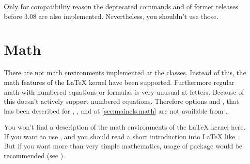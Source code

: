 Only for compatibility reason the deprecated commands  and
 of former 
releases before 3.08 are also implemented. Nevertheless, you shouldn't use
those.%
%
%
%
%
%
%
%
%
%






\section{Math}
\label{sec:scrlttr2.math}%
%
%
%

There are not math environments implemented at the \KOMAScript{}
classes. Instead of this, the math features of the \LaTeX{} kernel have been
supported. Furthermore regular math with numbered
equations or formulas is very unusual at letters. Because of this
 doesn't actively support numbered equations. Therefore
options  and , that has been described for
, , and  at
\autoref{sec:maincls.math} are not available from .

You won't find a description of the math environments of the \LaTeX{} kernel
here. If you want to use ,
 and
 you should read a short introduction
into \LaTeX{} like \cite{lshort}. But if you want more than
very simple mathematics, usage of package  would be
recommended (see \cite{package:amsmath}).%
%

